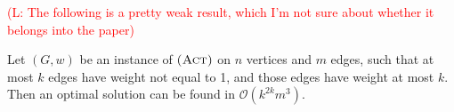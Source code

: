 \documentclass[runningheads]{llncs}
\numberwithin{equation}{section}
\newcommand{\N}{\mathbb{N}}
\newcommand{\set}[1]{\{ #1 \}}
\newcommand{\fromto}[2]{\set{#1, \ldots, #2}}
\newcommand{\comment}[1]{\textcolor{red}{(L: #1)}}
\newcommand{\bigO}{\mathcal{O}}
\newcommand{\act}{\textsc{(Act)}}
\newcommand{\stact}{\textsc{(stAct)}}
\newcommand{\True}{\textsc{True}}
\begin{document}
%
%
%

\comment{The following is a pretty weak result, which I'm not sure about whether it belongs into the paper}

\begin{theorem}
Let $(G, w)$ be an instance of $\act$ on $n$ vertices and $m$ edges, such that at most $k$ edges have weight not equal to 1, and those edges have weight at most $k$. Then an optimal solution can be found in $\bigO(k^{2k}m^3)$.
\end{theorem}
\end{document}
